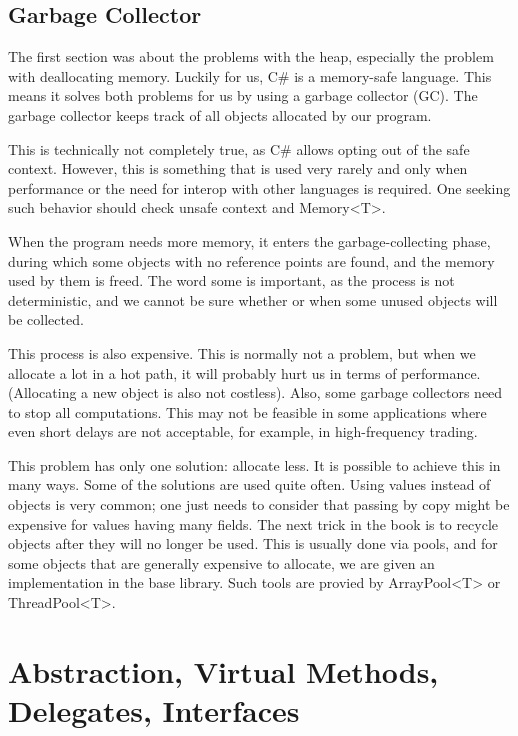\subsection{Garbage Collector}
The first section was about the problems with the heap, especially the problem with deallocating memory. Luckily for us, C\# is a memory-safe language. This means it solves both problems for us by using a garbage collector (GC). The garbage collector keeps track of all objects allocated by our program.

\begin{rem}
    This is technically not completely true, as C\# allows opting out of the safe context. However, this is something that is used very rarely and only when performance or the need for interop with other languages is required. One seeking such behavior should check unsafe context and Memory<T>.
\end{rem}

When the program needs more memory, it enters the garbage-collecting phase, during which some objects with no reference points are found, and the memory used by them is freed. The word some is important, as the process is not deterministic, and we cannot be sure whether or when some unused objects will be collected.

This process is also expensive. This is normally not a problem, but when we allocate a lot in a hot path, it will probably hurt us in terms of performance. (Allocating a new object is also not costless). Also, some garbage collectors need to stop all computations. This may not be feasible in some applications where even short delays are not acceptable, for example, in high-frequency trading.

This problem has only one solution: allocate less. It is possible to achieve this in many ways. Some of the solutions are used quite often.  Using values instead of objects is very common; one just needs to consider that passing by copy might be expensive for values having many fields. The next trick in the book is to recycle objects after they will no longer be used. This is usually done via pools, and for some objects that are generally expensive to allocate, we are given an implementation in the base library. Such tools are provied by ArrayPool<T> or ThreadPool<T>.

\section{Abstraction, Virtual Methods, Delegates, Interfaces}

